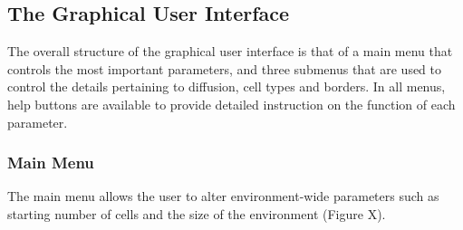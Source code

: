 \documentclass[12pt]{article}
\begin{document}
\subsection{The Graphical User Interface}
The overall structure of the graphical user interface is that of a main 
menu that controls the most important parameters, and three submenus 
that are used to control the details pertaining to diffusion, cell types 
and borders. In all menus, help buttons are available to provide 
detailed instruction on the function of each parameter.

\subsubsection{Main Menu}

The main menu allows the user to alter environment-wide parameters such 
as starting number of cells and the size of the environment (Figure X). 
\end{document}
